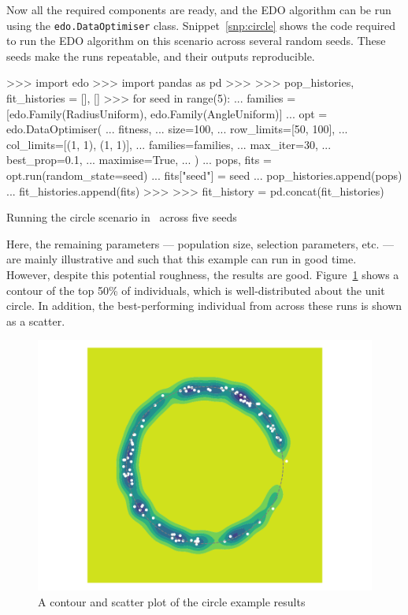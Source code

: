 Now all the required components are ready, and the EDO algorithm can be run
using the \texttt{edo.DataOptimiser} class.
Snippet~\ref{snp:circle} shows the code required to run the EDO algorithm on
this scenario across several random seeds. These seeds make the runs repeatable,
and their outputs reproducible.

\begin{listing}[htbp]
\begin{usagepy}
>>> import edo
>>> import pandas as pd
>>> 
>>> pop_histories, fit_histories = [], []
>>> for seed in range(5):
...     families = [edo.Family(RadiusUniform), edo.Family(AngleUniform)]
...     opt = edo.DataOptimiser(
...         fitness,
...         size=100,
...         row_limits=[50, 100],
...         col_limits=[(1, 1), (1, 1)],
...         families=families,
...         max_iter=30,
...         best_prop=0.1,
...         maximise=True,
...     )
...     pops, fits = opt.run(random_state=seed)
...     fits["seed"] = seed
...     pop_histories.append(pops)
...     fit_histories.append(fits)
>>> 
>>> fit_history = pd.concat(fit_histories)

\end{usagepy}
\caption{Running the circle scenario in \edo\ across five seeds}
\label{snp:circle}
\end{listing}

Here, the remaining parameters --- population size, selection parameters, etc.
--- are mainly illustrative and such that this example can run in good time.
However, despite this potential roughness, the results are good.
Figure~\ref{fig:circle} shows a contour of the top 50\% of individuals, which is
well-distributed about the unit circle. In addition, the best-performing
individual from across these runs is shown as a scatter.

\begin{figure}
    \centering
    \includegraphics[width=\imgwidth]{img/circle/main}
    \caption{A contour and scatter plot of the circle example results}
    \label{fig:circle}
\end{figure}
\graphicspath{{chapters/edo/paper/img/}}

